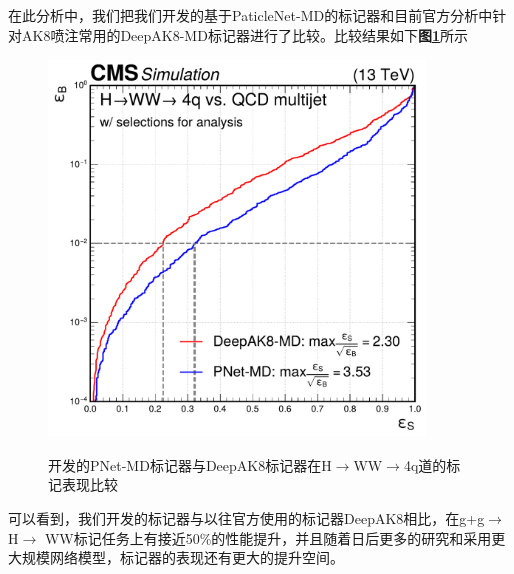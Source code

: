 在此分析中，我们把我们开发的基于PaticleNet-MD的标记器和目前官方分析中针对AK8喷注常用的DeepAK8-MD标记器进行了比较。比较结果如下\textbf{图\ref{fig:5.6}}所示
\begin{figure}[H]
 \centering\label{fig:5.6}
 \caption{开发的PNet-MD标记器与DeepAK8标记器在H$\to$WW$\to$4q道的标记表现比较}
 \includegraphics[height=10cm, width=10cm]{pictures/ana_roc_4q.pdf}
 \label{fig:5.6}
\end{figure}

可以看到，我们开发的标记器与以往官方使用的标记器DeepAK8相比，在g+g$\to$ H$\to$ WW标记任务上有接近50\%的性能提升，并且随着日后更多的研究和采用更大规模网络模型，标记器的表现还有更大的提升空间。

